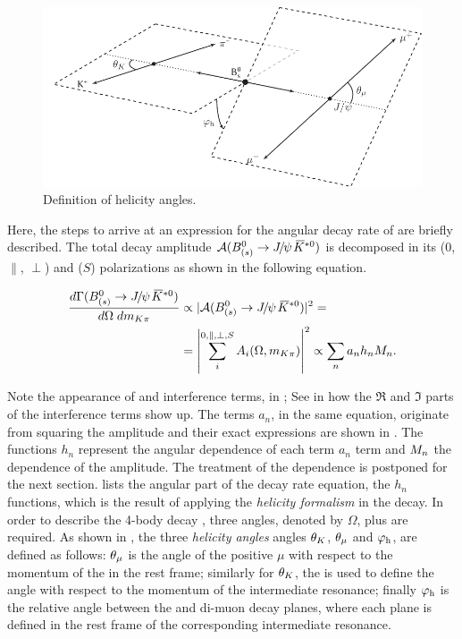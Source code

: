 \begin{figure}[t]
  \centering
  \includegraphics[width=\textwidth]{Figures/Chapter4/helAngles}
  \caption{Definition of helicity angles.}
  \label{helAngles}
\end{figure}

Here, the steps to arrive at an expression for the angular decay rate of \BsJpsiKst are briefly described.
The total decay amplitude $\mathcal{A}(\text{\BJpsiKst})$ is decomposed in its \pwave ($0$, $\parallel$, $\perp$)
and \swave ($S$) polarizations as shown in the following equation.

\begin{align}
  \centering
  \frac{d\Gamma(\text{\BJpsiKst})}{d\Omega\;d\mkpi} &\propto |\mathcal{A}(\text{\BJpsiKst})|^2 = \nonumber \\
                                                    &= \left| \sum_i^{0,\parallel,\perp,S} A_i(\Omega,\mkpi) \right|^2  \propto \sum_n a_n h_n \mKpiAmp.
  \label{ang_terms}
\end{align}

\noindent Note the appearance of \pwave and \spwave interference terms, in ; See in\cite{jeroenThesis} how the $\Re$
and $\Im$ parts of the interference terms show up. The terms $a_n$, in the same equation,
originate from squaring the amplitude and their exact expressions are shown in .
The functions $h_n$ represent the angular dependence of each term $a_n$ term and $M_{n}$ the \mkpi dependence of
the amplitude. The treatment of the \mkpi dependence is postponed for the next section.  lists the angular
part of the decay rate equation, \ie the $h_n$ functions, which is the result of
applying the \emph{helicity formalism} in the \BJpsiKst decay. In order to describe the 4-body decay \BJpsiKst, three
angles, denoted by $\Omega$, plus \mkpi are required. As shown in , the three \emph{helicity angles} angles
$\theta_{K}$, $\theta_{\mu}$ and ${\varphi_{\text h}}$, are defined as follows: $\theta_{\mu}$ is the angle of the positive $\mu$ with respect to the
momentum of the \jpsi in the \Bs rest frame; similarly for $\theta_{K}$, the \kaon is used to define the angle with respect to
the momentum of the intermediate \Kpi resonance; finally ${\varphi_{\text h}}$ is the relative angle between the \Kpi and di-muon decay
planes, where each plane is defined in the rest frame of the corresponding intermediate resonance.


